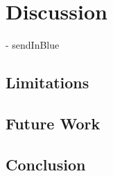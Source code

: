 



\chapter{Discussion}
- sendInBlue
\section{Limitations}
\section{Future Work}
\section{Conclusion}